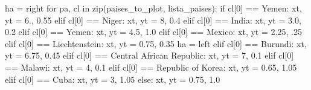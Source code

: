 \documentclass[
  letterpaper,
  DIV=11,
  numbers=noendperiod]{scrreprt}
\newenvironment{Shaded}{\begin{snugshade}}{\end{snugshade}}
\newcommand{\BuiltInTok}[1]{\textcolor[rgb]{0.00,0.23,0.31}{#1}}
\newcommand{\ControlFlowTok}[1]{\textcolor[rgb]{0.00,0.23,0.31}{#1}}
\newcommand{\DecValTok}[1]{\textcolor[rgb]{0.68,0.00,0.00}{#1}}
\newcommand{\FloatTok}[1]{\textcolor[rgb]{0.68,0.00,0.00}{#1}}
\newcommand{\KeywordTok}[1]{\textcolor[rgb]{0.00,0.23,0.31}{#1}}
\newcommand{\NormalTok}[1]{\textcolor[rgb]{0.00,0.23,0.31}{#1}}
\newcommand{\OperatorTok}[1]{\textcolor[rgb]{0.37,0.37,0.37}{#1}}
\newcommand{\StringTok}[1]{\textcolor[rgb]{0.13,0.47,0.30}{#1}}
\begin{document}
\begin{Shaded}
\begin{Highlighting}[]
\NormalTok{ha }\OperatorTok{=} \StringTok{\textquotesingle{}right\textquotesingle{}}
\ControlFlowTok{for}\NormalTok{ pa, cl }\KeywordTok{in} \BuiltInTok{zip}\NormalTok{(paises\_to\_plot, lista\_paises):}
    \ControlFlowTok{if}\NormalTok{ cl[}\DecValTok{0}\NormalTok{] }\OperatorTok{==} \StringTok{\textquotesingle{}Yemen\textquotesingle{}}\NormalTok{:}
\NormalTok{        xt, yt }\OperatorTok{=} \FloatTok{6.}\NormalTok{, }\FloatTok{0.55}
    \ControlFlowTok{elif}\NormalTok{ cl[}\DecValTok{0}\NormalTok{] }\OperatorTok{==} \StringTok{\textquotesingle{}Niger\textquotesingle{}}\NormalTok{:}
\NormalTok{        xt, yt }\OperatorTok{=} \DecValTok{8}\NormalTok{, }\FloatTok{0.4}
    \ControlFlowTok{elif}\NormalTok{ cl[}\DecValTok{0}\NormalTok{] }\OperatorTok{==} \StringTok{\textquotesingle{}India\textquotesingle{}}\NormalTok{:}
\NormalTok{        xt, yt }\OperatorTok{=} \FloatTok{3.0}\NormalTok{, }\FloatTok{0.2}
    \ControlFlowTok{elif}\NormalTok{ cl[}\DecValTok{0}\NormalTok{] }\OperatorTok{==} \StringTok{\textquotesingle{}Yemen\textquotesingle{}}\NormalTok{:}
\NormalTok{        xt, yt }\OperatorTok{=} \FloatTok{4.5}\NormalTok{, }\FloatTok{1.0}
    \ControlFlowTok{elif}\NormalTok{ cl[}\DecValTok{0}\NormalTok{] }\OperatorTok{==} \StringTok{\textquotesingle{}Mexico\textquotesingle{}}\NormalTok{:}
\NormalTok{        xt, yt }\OperatorTok{=} \FloatTok{2.25}\NormalTok{, }\FloatTok{.25}
    \ControlFlowTok{elif}\NormalTok{ cl[}\DecValTok{0}\NormalTok{] }\OperatorTok{==} \StringTok{\textquotesingle{}Liechtenstein\textquotesingle{}}\NormalTok{:}
\NormalTok{        xt, yt }\OperatorTok{=} \FloatTok{0.75}\NormalTok{, }\FloatTok{0.35}
\NormalTok{        ha }\OperatorTok{=} \StringTok{\textquotesingle{}left\textquotesingle{}}
    \ControlFlowTok{elif}\NormalTok{ cl[}\DecValTok{0}\NormalTok{] }\OperatorTok{==} \StringTok{\textquotesingle{}Burundi\textquotesingle{}}\NormalTok{:}
\NormalTok{        xt, yt }\OperatorTok{=} \FloatTok{6.75}\NormalTok{, }\FloatTok{0.45}
    \ControlFlowTok{elif}\NormalTok{ cl[}\DecValTok{0}\NormalTok{] }\OperatorTok{==} \StringTok{\textquotesingle{}Central African Republic\textquotesingle{}}\NormalTok{:}
\NormalTok{        xt, yt }\OperatorTok{=} \DecValTok{7}\NormalTok{, }\FloatTok{0.1}
    \ControlFlowTok{elif}\NormalTok{ cl[}\DecValTok{0}\NormalTok{] }\OperatorTok{==} \StringTok{\textquotesingle{}Malawi\textquotesingle{}}\NormalTok{:}
\NormalTok{        xt, yt }\OperatorTok{=} \DecValTok{4}\NormalTok{, }\FloatTok{0.1}
    \ControlFlowTok{elif}\NormalTok{ cl[}\DecValTok{0}\NormalTok{] }\OperatorTok{==} \StringTok{\textquotesingle{}Republic of Korea\textquotesingle{}}\NormalTok{:}
\NormalTok{        xt, yt }\OperatorTok{=} \FloatTok{0.65}\NormalTok{, }\FloatTok{1.05}
    \ControlFlowTok{elif}\NormalTok{ cl[}\DecValTok{0}\NormalTok{] }\OperatorTok{==} \StringTok{\textquotesingle{}Cuba\textquotesingle{}}\NormalTok{:}
\NormalTok{        xt, yt }\OperatorTok{=} \DecValTok{3}\NormalTok{, }\FloatTok{1.05}
    \ControlFlowTok{else}\NormalTok{:}
\NormalTok{        xt, yt }\OperatorTok{=} \FloatTok{0.75}\NormalTok{, }\FloatTok{1.0}


\end{Highlighting}
\end{Shaded}
\end{document}

